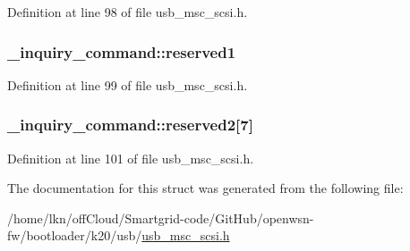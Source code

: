 Definition at line 98 of file usb\+\_\+msc\+\_\+scsi.\+h.

\subsubsection[{\texorpdfstring{reserved1}{reserved1}}]{ \+\_\+inquiry\+\_\+command\+::reserved1}\hypertarget{struct__inquiry__command_a53215dd8e2679538d06b1a55ccebb5b8}{}\label{struct__inquiry__command_a53215dd8e2679538d06b1a55ccebb5b8}


Definition at line 99 of file usb\+\_\+msc\+\_\+scsi.\+h.

\subsubsection[{\texorpdfstring{reserved2}{reserved2}}]{ \+\_\+inquiry\+\_\+command\+::reserved2\mbox{[}7\mbox{]}}\hypertarget{struct__inquiry__command_ac4b768c51bf26ebd95b837328c27994f}{}\label{struct__inquiry__command_ac4b768c51bf26ebd95b837328c27994f}


Definition at line 101 of file usb\+\_\+msc\+\_\+scsi.\+h.



The documentation for this struct was generated from the following file\+:\begin{DoxyCompactItemize}
\item 
/home/lkn/off\+Cloud/\+Smartgrid-\/code/\+Git\+Hub/openwsn-\/fw/bootloader/k20/usb/\hyperlink{usb__msc__scsi_8h}{usb\+\_\+msc\+\_\+scsi.\+h}\end{DoxyCompactItemize}
